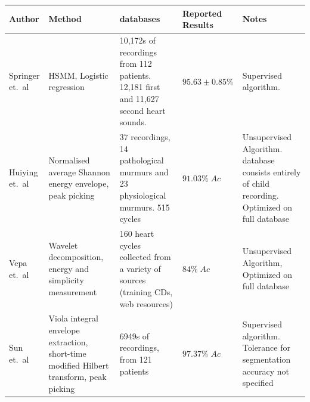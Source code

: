 \documentclass[titlepage, 12pt]{scrartcl} \usepackage{enumitem}
\newcommand{\dtoprule}{\specialrule{1pt}{0pt}{1.4pt}%
            \specialrule{1pt}{0pt}{\belowrulesep}%
            }
\begin{document}
\begin{landscape}
\begin{table}[htbp]
     \label{SegmentationTable}
\scriptsize
{}
\doublespacing
\begin{tabulary}{\linewidth}{LLLLL}
\dtoprule
Author                 & Method                                                                                         & databases                                                                                       & \mbox{Reported} Results         & Notes                                                                                            \\ \bottomrule
Springer et.\ al \citeyearpar{Springer2016} & HSMM, Logistic regression                                                                       & 10,172s of recordings from 112 patients. 12,181 first and 11,627 second heart sounds. & $95.63\pm0.85\%$                             & Supervised algorithm.                                                                                                                                                            \\
Huiying et.\ al \citeyearpar{Liang1997b} & Normalised average Shannon energy envelope, peak picking                                        & 37 recordings, 14 pathological murmurs and 23 physiological murmurs. 515 cycles       & $91.03\%\;Ac$                                          & Unsupervised Algorithm.  database consists entirely of child recording. Optimized on full database                                                                                 \\
Vepa et.\ al \citeyearpar{Vepa2008}     & Wavelet decomposition, energy and simplicity measurement                                       & 160 heart cycles collected from a variety of sources (training CDs, web resources)    & $84\%\;Ac$                                             & Unsupervised Algorithm, Optimized on full database                                                                                                                                \\
Sun et.\ al \citeyearpar{Sun2014}             & Viola integral envelope extraction, short-time modified Hilbert transform, peak picking        & 6949s of recordings, from 121 patients                                                & $97.37\%\;Ac$                                          & Supervised algorithm. Tolerance for segmentation accuracy not specified                                                                                                          \\

\end{tabulary}
\end{table}
\end{landscape}
\end{document}
